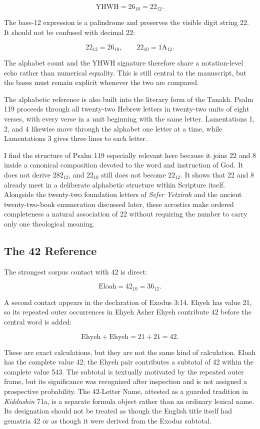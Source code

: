 \[
\text{YHWH}=26_{10}=22_{12}.
\]

The base-12 expression is a palindrome and preserves the visible digit string 22. It should not be confused with decimal 22:

\[
22_{12}=26_{10},
\qquad
22_{10}=1\mathrm{A}_{12}.
\]

The alphabet count and the YHWH signature therefore share a notation-level echo rather than numerical equality. This is still central to the manuscript, but the bases must remain explicit whenever the two are compared.

The alphabetic reference is also built into the literary form of the Tanakh. Psalm 119 proceeds through all twenty-two Hebrew letters in twenty-two units of eight verses, with every verse in a unit beginning with the same letter. Lamentations 1, 2, and 4 likewise move through the alphabet one letter at a time, while Lamentations 3 gives three lines to each letter.\cite{oshb}

I find the structure of Psalm 119 especially relevant here because it joins 22 and 8 inside a canonical composition devoted to the word and instruction of God. It does not derive $282_{12}$, and $22_{10}$ still does not become $22_{12}$. It shows that 22 and 8 already meet in a deliberate alphabetic structure within Scripture itself. Alongside the twenty-two foundation letters of \emph{Sefer Yetzirah} and the ancient twenty-two-book enumeration discussed later, these acrostics make ordered completeness a natural association of 22 without requiring the number to carry only one theological meaning.

\subsection{The 42 Reference}

The strongest corpus contact with 42 is direct:

\[
\text{Eloah}=42_{10}=36_{12}.
\]

A second contact appears in the declaration of Exodus 3:14.\cite{exodus314} Ehyeh has value 21, so its repeated outer occurrences in Ehyeh Asher Ehyeh contribute 42 before the central word is added:

\[
\text{Ehyeh}+\text{Ehyeh}=21+21=42.
\]

These are exact calculations, but they are not the same kind of calculation. Eloah has the complete value 42; the Ehyeh pair contributes a subtotal of 42 within the complete value 543. The subtotal is textually motivated by the repeated outer frame, but its significance was recognized after inspection and is not assigned a prospective probability. The 42-Letter Name, attested as a guarded tradition in \emph{Kiddushin} 71a, is a separate formula object rather than an ordinary lexical name.\cite{kiddushin42} Its designation should not be treated as though the English title itself had gematria 42 or as though it were derived from the Exodus subtotal.

